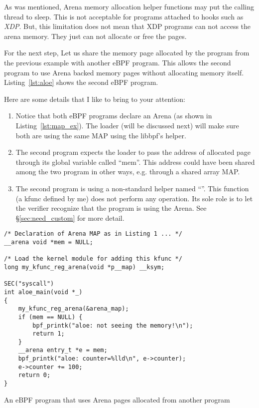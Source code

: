 \documentclass{article}
\begin{document}
As was mentioned, Arena memory allocation helper functions may put the calling
thread to sleep. This is not acceptable for programs attached to hooks such as
\emph{XDP}. But, this limitation does not mean that XDP programs can not access
the arena memory. They just can not allocate or free the pages.

For the next step, Let us share the memory page allocated by the program
from the previous example with another eBPF program. This allows the second
program to use Arena backed memory pages without allocating memory itself.
Listing~\ref{lst:aloe} shows the second eBPF program.

Here are some details that I like to bring to your attention:
\begin{enumerate}
    \item Notice that both eBPF programs declare an Arena (as shown in
        Listing~\ref{lst:map_ex}). The loader (will be discussed next) will
        make sure both are using the same MAP using the libbpf's
         helper.
    \item The second program expects the loader to pass the address of
        allocated page through its global variable called ``mem''. This address
        could have been shared among the two program in other ways, e.g.
        through a shared array MAP\@.
    \item The second program is using a non-standard helper named
        ``''. This function (a kfunc defined by me)
        does not perform any operation. Its sole role is to let the verifier
        recognize that the program is using the Arena. See
        \S\ref{sec:need_custom} for more detail.
\end{enumerate}

\begin{listing}
\begin{verbatim}
/* Declaration of Arena MAP as in Listing 1 ... */
__arena void *mem = NULL;

/* Load the kernel module for adding this kfunc */
long my_kfunc_reg_arena(void *p__map) __ksym;

SEC("syscall")
int aloe_main(void *_)
{
    my_kfunc_reg_arena(&arena_map);
    if (mem == NULL) {
        bpf_printk("aloe: not seeing the memory!\n");
        return 1;
    }
    __arena entry_t *e = mem;
    bpf_printk("aloe: counter=%lld\n", e->counter);
    e->counter += 100;
    return 0;
}
\end{verbatim}
\caption{An eBPF program that uses Arena pages allocated from another program}
\label{lst:aloe}
\end{listing}
\end{document}
